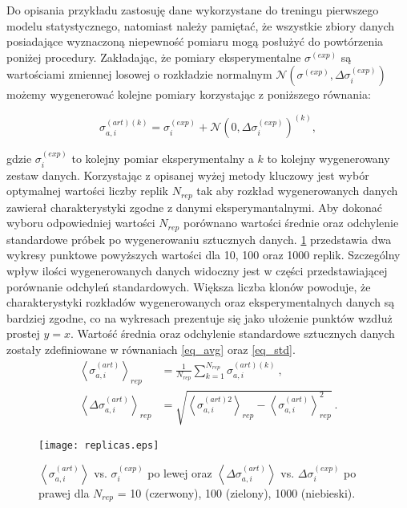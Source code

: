 \documentclass[11pt]{book}
\theoremstyle{definition}
\begin{document}
Do opisania przykładu zastosuję dane wykorzystane do treningu pierwszego modelu statystycznego, natomiast należy pamiętać, że wszystkie zbiory danych posiadające wyznaczoną niepewność pomiaru mogą posłużyć do powtórzenia poniżej procedury. Zakładając, że pomiary eksperymentalne $\sigma^{(exp)}$ są wartościami zmiennej losowej o rozkładzie normalnym $\mathcal{N}\left( \sigma^{(exp)}, \Delta \sigma_i^{(exp)} \right)$  możemy wygenerować kolejne pomiary korzystając z poniższego równania:

%
\begin{equation}
\sigma^{(art)(k)}_{a,i} = \sigma_i^{(exp)} + \mathcal{N}\left( 0, \Delta \sigma_i^{(exp)} \right)^{(k)},
\end{equation} 

gdzie $\sigma_i^{(exp)}$ to kolejny pomiar eksperymentalny a $k$ to kolejny wygenerowany zestaw danych.
%
Korzystając z opisanej wyżej metody kluczowy jest wybór optymalnej wartości liczby replik $N_{rep}$ tak aby rozkład wygenerowanych danych zawierał charakterystyki zgodne z danymi eksperymantalnymi. Aby dokonać wyboru odpowiedniej wartości $N_{rep}$ porównano wartości średnie oraz odchylenie standardowe próbek po wygenerowaniu sztucznych danych. \figurename{} \ref{fig:repliki} przedstawia dwa wykresy punktowe powyższych wartości dla 10, 100 oraz 1000 replik. Szczególny wpływ ilości wygenerowanych danych widoczny jest w części przedstawiającej porównanie odchyleń standardowych. Większa liczba klonów powoduje, że charakterystyki rozkładów wygenerowanych oraz eksperymentalnych danych są bardziej zgodne, co na wykresach prezentuje się jako ułożenie punktów wzdłuż prostej $y=x$. Wartość średnia oraz odchylenie standardowe sztucznych danych zostały zdefiniowane w równaniach \ref{eq_avg} oraz \ref{eq_std}.
%
\begin{subequations}
	\begin{align}
	\left \langle \sigma_{a,i}^{(art)} \right \rangle_{rep} &= \frac{1}{N_{rep}} \sum_{k=1}^{N_{rep}} \sigma_{a,i}^{(art)(k)}~,
	\label{eq_avg} \\
	\left \langle \Delta \sigma_{a,i}^{(art)} \right \rangle_{rep} &= \sqrt{\left \langle \sigma_{a,i}^{(art)2} \right\rangle_{rep} - \left\langle \sigma_{a,i}^{(art)} \right\rangle^2_{rep} }~.
	\label{eq_std}
	\end{align}
\end{subequations}
%
\begin{figure}[htp!]
	\centering
	\texttt{[image: replicas.eps]}
	\caption{$\left \langle \sigma_{a,i}^{(art)} \right\rangle$ vs. $\sigma_i^{(exp)}$ po lewej oraz $\left \langle \Delta \sigma_{a,i}^{(art)} \right \rangle$ vs. $\Delta \sigma_i^{(exp)}$ po prawej dla $N_{rep}$ = 10 (czerwony), 100 (zielony), 1000 (niebieski).} 
	\label{fig:repliki}
\end{figure}
\end{document}
